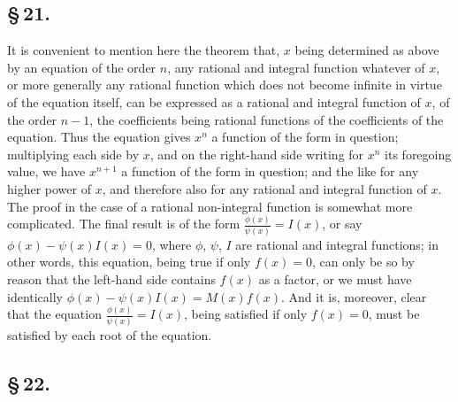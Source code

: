 \documentclass[11pt,a4paper]{book}
\begin{document}
\subsection*{\S\,21.}

It is convenient to mention here the theorem that, $x$ being determined as above by an equation of the order $n$, any rational and integral function whatever of $x$, or more generally any rational function which does not become infinite in virtue of the equation itself, can be expressed as a rational and integral function of $x$, of the order $n - 1$, the coefficients being rational functions of the coefficients of the equation. Thus the equation gives $x^{n}$ a function of the form in question; multiplying each side by $x$, and on the right-hand side writing for $x^{n}$ its foregoing value, we have $x^{n+1}$ a function of the form in question; and the like for any higher power of $x$, and therefore also for any rational and integral function of $x$. The proof in the case of a rational non-integral function is somewhat more complicated. The final result is of the form $\frac{\phi(x)}{\psi(x)} = I(x)$, or say $\phi(x) - \psi(x)I(x) = 0$, where $\phi$, $\psi$, $I$ are rational and integral functions; in other words, this equation, being true if only $f(x) = 0$, can only be so by reason that the left-hand side contains $f(x)$ as a factor, or we must have identically $\phi(x) - \psi(x)I(x) = M(x)f(x)$. And it is, moreover, clear that the equation $\frac{\phi(x)}{\psi(x)} = I(x)$, being satisfied if only $f(x) = 0$, must be satisfied by each root of the equation.

\subsection*{\S\,22.}
\end{document}
